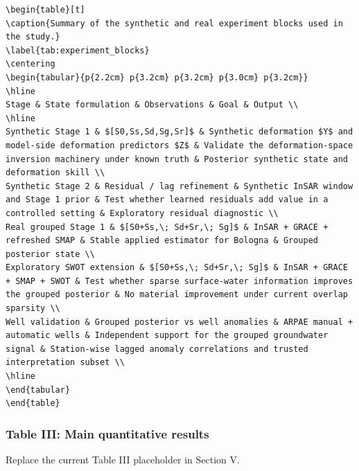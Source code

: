 \begin{verbatim}
\begin{table}[t]
\caption{Summary of the synthetic and real experiment blocks used in the study.}
\label{tab:experiment_blocks}
\centering
\begin{tabular}{p{2.2cm} p{3.2cm} p{3.2cm} p{3.0cm} p{3.2cm}}
\hline
Stage & State formulation & Observations & Goal & Output \\
\hline
Synthetic Stage 1 & $[S0,Ss,Sd,Sg,Sr]$ & Synthetic deformation $Y$ and model-side deformation predictors $Z$ & Validate the deformation-space inversion machinery under known truth & Posterior synthetic state and deformation skill \\
Synthetic Stage 2 & Residual / lag refinement & Synthetic InSAR window and Stage 1 prior & Test whether learned residuals add value in a controlled setting & Exploratory residual diagnostic \\
Real grouped Stage 1 & $[S0+Ss,\; Sd+Sr,\; Sg]$ & InSAR + GRACE + refreshed SMAP & Stable applied estimator for Bologna & Grouped posterior state \\
Exploratory SWOT extension & $[S0+Ss,\; Sd+Sr,\; Sg]$ & InSAR + GRACE + SMAP + SWOT & Test whether sparse surface-water information improves the grouped posterior & No material improvement under current overlap sparsity \\
Well validation & Grouped posterior vs well anomalies & ARPAE manual + automatic wells & Independent support for the grouped groundwater signal & Station-wise lagged anomaly correlations and trusted interpretation subset \\
\hline
\end{tabular}
\end{table}
\end{verbatim}

\subsubsection*{Table III: Main quantitative results}
Replace the current Table III placeholder in Section V.

